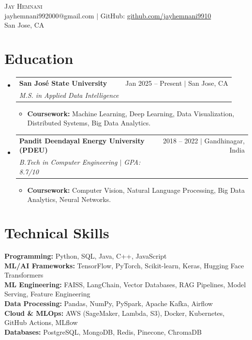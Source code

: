 \documentclass[letterpaper,10pt]{article}
\makeatletter
\newcommand{\resumeItem}[1]{\item\small{#1 \vspace{-3pt}}}
\newcommand{\resumeSubheading}[4]{
  \vspace{-3pt}\item
    \begin{tabular*}{0.97\textwidth}[t]{l@{\extracolsep{\fill}}r}
      \textbf{#1} & #2 \\
      \textit{\small#3} & \textit{\small #4} \\
    \end{tabular*}\vspace{-8pt}
}
\newcommand{\resumeSubHeadingListStart}{\begin{itemize}[leftmargin=0.12in, label={}]}
\newcommand{\resumeSubHeadingListEnd}{\end{itemize}}
\newcommand{\resumeItemListStart}{\begin{itemize}[leftmargin=0.15in]}
\newcommand{\resumeItemListEnd}{\end{itemize}\vspace{-6pt}}
\makeatother
\begin{document}
\begin{center}
    {\Huge \scshape Jay Hemnani} \\ \vspace{2pt}
    \small jayhemnani992000@gmail.com $|$ GitHub: \href{https://github.com/jayhemnani9910}{github.com/jayhemnani9910} \\
    San Jose, CA
\end{center}

\section{Education}
  \resumeSubHeadingListStart
    \resumeSubheading
      {San Jos\'{e} State University}{Jan 2025 -- Present $|$ San Jose, CA}
      {M.S. in Applied Data Intelligence}{}
      \resumeItemListStart
        \resumeItem{\textbf{Coursework:} Machine Learning, Deep Learning, Data Visualization, Distributed Systems, Big Data Analytics.}
      \resumeItemListEnd
    \resumeSubheading
      {Pandit Deendayal Energy University (PDEU)}{2018 -- 2022 $|$ Gandhinagar, India}
      {B.Tech in Computer Engineering $|$ GPA: 8.7/10}{}
      \resumeItemListStart
        \resumeItem{\textbf{Coursework:} Computer Vision, Natural Language Processing, Big Data Analytics, Neural Networks.}
      \resumeItemListEnd
  \resumeSubHeadingListEnd

\section{Technical Skills}
 \begin{itemize}[leftmargin=0.12in, label={}]
    \small{\item{
     \textbf{Programming:} Python, SQL, Java, C++, JavaScript \\
     \textbf{ML/AI Frameworks:} TensorFlow, PyTorch, Scikit-learn, Keras, Hugging Face Transformers \\
     \textbf{ML Engineering:} FAISS, LangChain, Vector Databases, RAG Pipelines, Model Serving, Feature Engineering \\
     \textbf{Data Processing:} Pandas, NumPy, PySpark, Apache Kafka, Airflow \\
     \textbf{Cloud \& MLOps:} AWS (SageMaker, Lambda, S3), Docker, Kubernetes, GitHub Actions, MLflow \\
     \textbf{Databases:} PostgreSQL, MongoDB, Redis, Pinecone, ChromaDB
    }}
 \end{itemize}
 \vspace{-8pt}
\end{document}
